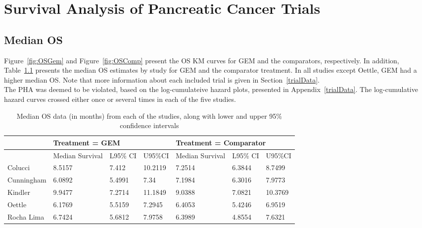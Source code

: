 \chapter{Survival Analysis of Pancreatic Cancer Trials}

\section{Median OS}

Figure~\ref{fig:OSGem} and Figure~\ref{fig:OSComp} present the OS KM curves for GEM and the comparators, respectively. In addition, Table~\ref{tab:OS_meds} presents the median OS estimates by study for GEM and the comparator treatment. In all studies except Oettle, GEM had a higher median OS. Note that more information about each included trial is given in Section~\ref{trialData}. \\

The PHA was deemed to be violated, based on the log-cumulateive hazard plots, presented in Appendix~\ref{trialData}. The log-cumulative hazard curves crossed either once or several times in each of the five studies.

\begin{table}[h]
    \begin{tabular}{lllllll}
    \hline
               & \multicolumn{3}{l}{Treatment = GEM}          & \multicolumn{3}{l}{Treatment = Comparator}   \\ \hline
               & Median Survival & L95\% CI & U95\%CI & Median Survival & L95\% CI & U95\%CI \\
    Colucci    & 8.5157          & 7.412        & 10.2119     & 7.2514          & 6.3844       & 8.7499      \\
    Cunningham & 6.0892          & 5.4991       & 7.34        & 7.1984          & 6.3016       & 7.9773      \\
    Kindler    & 9.9477          & 7.2714       & 11.1849     & 9.0388          & 7.0821       & 10.3769     \\
    Oettle     & 6.1769          & 5.5159       & 7.2945      & 6.4053          & 5.4246       & 6.9519      \\
    Rocha Lima & 6.7424          & 5.6812       & 7.9758      & 6.3989          & 4.8554       & 7.6321      \\ \hline
    \end{tabular}
    \caption{Median OS data (in months) from each of the studies, along with lower and upper 95\% confidence intervals}
    \label{tab:OS_meds}
\end{table}


